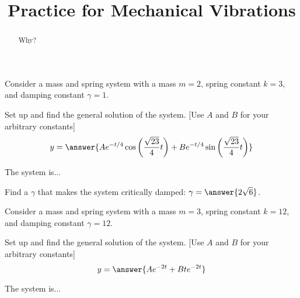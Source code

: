 \documentclass{ximera}
\title{Practice for Mechanical Vibrations}
\begin{document}
\begin{abstract}
    Why?
\end{abstract}
\maketitle


\begin{exercise} \label{mv:ex1}
    Consider a mass and spring system with a mass $m=2$, spring constant $k=3$, and damping constant $\gamma=1$.
    
    Set up and find the general solution of the system. [Use $A$ and $B$ for your arbitrary constants]
    \[
        y = \answer{Ae^{-t/4}\cos\left(\frac{\sqrt{23}}{4}t\right) + Be^{-t/4}\sin\left(\frac{\sqrt{23}}{4}t\right)}
    \]
    \begin{problem}
        The system is...
        \begin{multipleChoice}
        \end{multipleChoice}
        \begin{problem}
            Find a $\gamma$ that makes the system critically damped: $\gamma = \answer{2\sqrt{6}}$.
        \end{problem}
    \end{problem}
\end{exercise}


\begin{exercise}
    Consider a mass and spring system with a mass $m=3$, spring constant $k=12$, and damping constant $\gamma=12$.
    
    Set up and find the general solution of the system. [Use $A$ and $B$ for your arbitrary constants]
    \[
        y = \answer{Ae^{-2t} + Bte^{-2t}}
    \]
    \begin{problem}
        The system is...
        \begin{multipleChoice}
        \end{multipleChoice}
    \end{problem}
\end{exercise}
\end{document}
